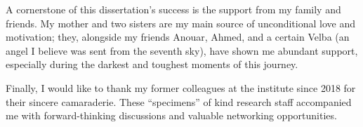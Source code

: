 A cornerstone of this dissertation's success is the support from my family and friends. My mother and two sisters are my main source of unconditional love and motivation; they, alongside my friends Anouar, Ahmed, and a certain Velba (an angel I believe was sent from the seventh sky), have shown me abundant support, especially during the darkest and toughest moments of this journey.

Finally, I would like to thank my former colleagues at the institute since 2018 for their sincere camaraderie. These ``specimens'' of kind research staff accompanied me with forward-thinking discussions and valuable networking opportunities. 
